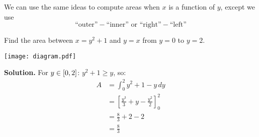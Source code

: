 We can use the same ideas to compute areas when $ x $ is a function of $ y $, except we use
\[ \text{``outer''}-\text{``inner''}\text{ or }\text{``right''}-\text{``left''}\]

\begin{Example}{}{}
    Find the area between $ x=y^2+1 $ and $ y=x $ from $ y=0 $ to $ y=2 $.

    \begin{center}
        \texttt{[image: diagram.pdf]}
    \end{center}

    \textbf{Solution.} For $ y\in\interval{0}{2} $: $ y^2+1\geqslant y $, so:
    \begin{align*}
        A & =\int_{0}^{2} y^2+1-y\, d{y}                       \\
          & =\left[ \frac{y^3}{3} +y-\frac{y^2}{2} \right]_0^2 \\
          & =\frac{8}{3} +2-2                                  \\
          & =\frac{8}{3}
    \end{align*}
\end{Example}
